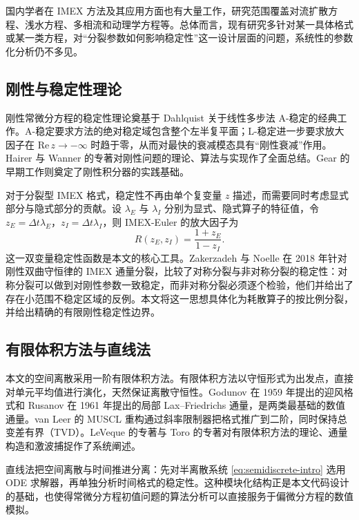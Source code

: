 国内学者在 IMEX 方法及其应用方面也有大量工作，研究范围覆盖对流扩散方程、浅水方程、多相流和动理学方程等。总体而言，现有研究多针对某一具体格式或某一类方程，对“分裂参数如何影响稳定性”这一设计层面的问题，系统性的参数化分析仍不多见。

\subsection{刚性与稳定性理论}

刚性常微分方程的稳定性理论奠基于 Dahlquist 关于线性多步法 A-稳定的经典工作\cite{dahlquist1963}。A-稳定要求方法的绝对稳定域包含整个左半复平面；L-稳定进一步要求放大因子在 $\mathrm{Re}\,z\to-\infty$ 时趋于零，从而对最快的衰减模态具有“刚性衰减”作用。Hairer 与 Wanner 的专著\cite{hairer1996}对刚性问题的理论、算法与实现作了全面总结。Gear 的早期工作\cite{gear1971}则奠定了刚性积分器的实践基础。

对于分裂型 IMEX 格式，稳定性不再由单个复变量 $z$ 描述，而需要同时考虑显式部分与隐式部分的贡献。设 $\lambda_E$ 与 $\lambda_I$ 分别为显式、隐式算子的特征值，令 $z_E=\Delta t\lambda_E$，$z_I=\Delta t\lambda_I$，则 IMEX-Euler 的放大因子为
\begin{equation}
  R(z_E,z_I)=\frac{1+z_E}{1-z_I}.
  \label{eq:R-intro}
\end{equation}
这一双变量稳定性函数是本文的核心工具。Zakerzadeh 与 Noelle 在 2018 年针对刚性双曲守恒律的 IMEX 通量分裂，比较了对称分裂与非对称分裂的稳定性：对称分裂可以做到对刚性参数一致稳定，而非对称分裂必须逐个检验，他们并给出了存在小范围不稳定区域的反例\cite{zakerzadeh2018}。本文将这一思想具体化为耗散算子的按比例分裂，并给出精确的有限刚性稳定性边界。

\subsection{有限体积方法与直线法}

本文的空间离散采用一阶有限体积方法。有限体积方法以守恒形式为出发点，直接对单元平均值进行演化，天然保证离散守恒性。Godunov 在 1959 年提出的迎风格式\cite{godunov1959}和 Rusanov 在 1961 年提出的局部 Lax--Friedrichs 通量\cite{rusanov1961}，是两类最基础的数值通量。van Leer 的 MUSCL 重构\cite{vanleer1979}通过斜率限制器把格式推广到二阶，同时保持总变差有界（TVD）。LeVeque 的专著\cite{leveque2002}与 Toro 的专著\cite{toro2009}对有限体积方法的理论、通量构造和激波捕捉作了系统阐述。

直线法把空间离散与时间推进分离：先对半离散系统 \eqref{eq:semidiscrete-intro} 选用 ODE 求解器，再单独分析时间格式的稳定性。这种模块化结构正是本文代码设计的基础，也使得常微分方程初值问题的算法分析可以直接服务于偏微分方程的数值模拟。

